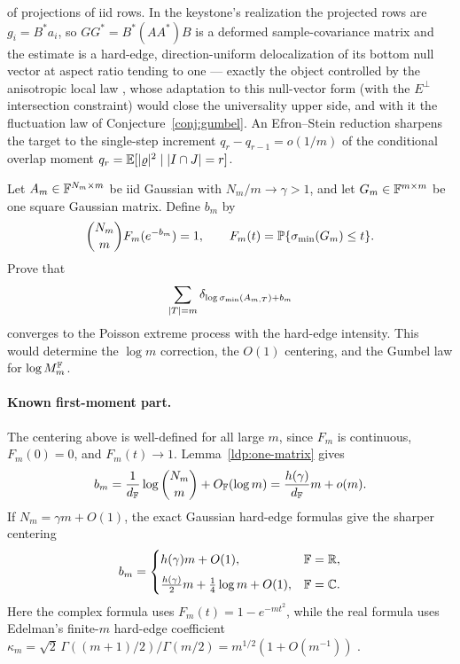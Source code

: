 \begin{problem}
of projections of iid rows.  In the keystone's realization the projected rows are $g_i=B^*a_i$, so
$GG^*=B^*(AA^*)B$ is a deformed sample-covariance matrix and the estimate is a hard-edge,
direction-uniform delocalization of its bottom null vector at aspect ratio tending to one --- exactly
the object controlled by the anisotropic local law \cite{KnowlesYin2017,BEKYY2014}, whose adaptation to
this null-vector form (with the $E^\perp$ intersection constraint) would close the universality upper
side, and with it the fluctuation law of Conjecture~\ref{conj:gumbel}.  An Efron--Stein reduction
sharpens the target to the single-step increment $q_r-q_{r-1}=o(1/m)$ of the conditional overlap
moment $q_r=\mathbb{E}[|\varrho|^2\mid |I\cap J|=r]$.
\end{problem}

\begin{conjecture}\label{conj:gumbel}
Let \(A_m\in\mathbb{F}^{N_m\times m}\) be iid Gaussian with \(N_m/m\to\gamma>1\), and
let \(G_m\in\mathbb{F}^{m\times m}\) be one square Gaussian matrix.  Define \(b_m\) by
\[
  \binom{N_m}{m}F_m(e^{-b_m})=1,\qquad
  F_m(t)=\mathbb{P}\{\sigma_{\min}(G_m)\le t\}.
\]
Prove that
\[
  \sum_{|T|=m}\delta_{\log\sigma_{\min}(A_{m,T})+b_m}
\]
converges to the Poisson extreme process with the hard-edge intensity.  This
would determine the \(\log m\) correction, the \(O(1)\) centering, and the
Gumbel law for \(\log M_m^{\mathbb{F}}\).
\end{conjecture}

\paragraph{Known first-moment part.}
The centering above is well-defined for all large \(m\), since \(F_m\) is
continuous, \(F_m(0)=0\), and \(F_m(t)\to1\).  Lemma~\ref{ldp:one-matrix} gives
\[
  b_m=\frac1{d_{\mathbb{F}}}\log\binom{N_m}{m}+O_{\mathbb{F}}(\log m)
      =\frac{h(\gamma)}{d_{\mathbb{F}}}m+o(m).
\]
If \(N_m=\gamma m+O(1)\), the exact Gaussian hard-edge formulas give the sharper
centering
\[
  b_m=
  \begin{cases}
    h(\gamma)m+O(1),& \mathbb{F}=\mathbb{R},\\[2mm]
    \frac{h(\gamma)}2m+\frac14\log m+O(1),& \mathbb{F}=\mathbb{C}.
  \end{cases}
\]
Here the complex formula uses \(F_m(t)=1-e^{-mt^2}\), while the real formula
uses Edelman's finite-\(m\) hard-edge coefficient
\(\kappa_m=\sqrt2\,\Gamma((m+1)/2)/\Gamma(m/2)=m^{1/2}(1+O(m^{-1}))\)
\cite{Edelman1988}.

